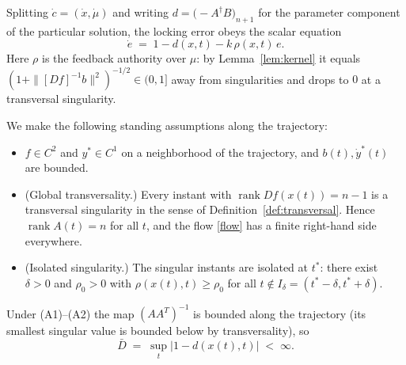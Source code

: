\documentclass[11pt,american]{article}
\DeclareMathOperator{\rank}{\operatorname{rank}}
\theoremstyle{definition}
\theoremstyle{plain}
\theoremstyle{remark}
\begin{document}
Splitting $\dot c = (\dot x, \dot \mu)$ and writing $d = \bigl( -A^\dagger B \bigr)_{n+1}$ for the parameter component of the particular solution, the locking error obeys the scalar equation
\begin{equation}\label{error_ode}
\dot e \;=\; 1 - d(x,t) - k\, \rho(x,t)\, e .
\end{equation}
Here $\rho$ is the feedback authority over $\mu$: by Lemma~\ref{lem:kernel} it equals $(1 + \|[Df]^{-1}b\|^2)^{-1/2} \in (0,1]$ away from singularities and drops to $0$ at a transversal singularity.

We make the following standing assumptions along the trajectory:

\begin{itemize}
\item[(A1)] $f \in C^2$ and $y^* \in C^1$ on a neighborhood of the trajectory, and $b(t), \dot y^*(t)$ are bounded.
\item[(A2)] (Global transversality.) Every instant with $\rank Df(x(t)) = n-1$ is a transversal singularity in the sense of Definition~\ref{def:transversal}. Hence $\rank A(t) = n$ for all $t$, and the flow \eqref{flow} has a finite right-hand side everywhere.
\item[(A3)] (Isolated singularity.) The singular instants are isolated at $t^*$: there exist $\delta > 0$ and $\rho_0 > 0$ with $\rho(x(t),t) \ge \rho_0$ for all $t \notin I_\delta = (t^*-\delta, t^*+\delta)$.
\end{itemize}

Under (A1)--(A2) the map $(AA^T)^{-1}$ is bounded along the trajectory (its smallest singular value is bounded below by transversality), so
\[
\bar D \;=\; \sup_t \bigl| 1 - d(x(t),t) \bigr| \;<\; \infty .
\]
\end{document}
